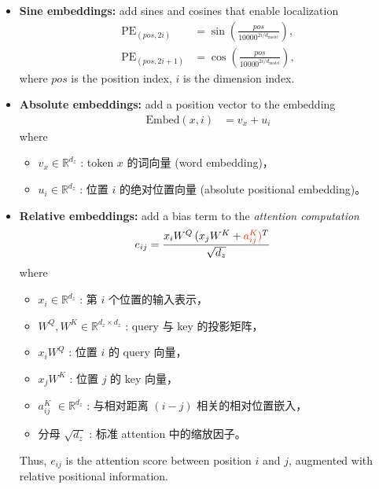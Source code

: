 \begin{itemize}
  \item \textbf{Sine embeddings:} add sines and cosines that enable localization
  \begin{align*}
    \mathrm{PE}_{(pos,2i)}   &= \sin\!\left(\frac{pos}{10000^{2i/d_{\text{model}}}}\right), \\
    \mathrm{PE}_{(pos,2i+1)} &= \cos\!\left(\frac{pos}{10000^{2i/d_{\text{model}}}}\right),
  \end{align*}
  where $pos$ is the position index, $i$ is the dimension index.

\item \textbf{Absolute embeddings:} add a position vector to the embedding
  \begin{align*}
    \mathrm{Embed}(x,i) &= v_x + u_i
  \end{align*}
  where 
  \begin{itemize}
    \item $v_x \in \mathbb{R}^{d_z}$ : token $x$ 的词向量 (word embedding)，
    \item $u_i \in \mathbb{R}^{d_z}$ : 位置 $i$ 的绝对位置向量 (absolute positional embedding)。
  \end{itemize}

  \item \textbf{Relative embeddings:} add a bias term to the \textit{attention computation}
  \begin{align*}
    e_{ij} &= \frac{x_i W^Q \,(x_j W^K + {\color{tred}a_{ij}^K)}^T}{\sqrt{d_z}}
  \end{align*}
  where
  \begin{itemize}
    \item $x_i \in \mathbb{R}^{d_z}$ : 第 $i$ 个位置的输入表示，
    \item $W^Q, W^K \in \mathbb{R}^{d_z \times d_z}$ : query 与 key 的投影矩阵，
    \item $x_i W^Q$ : 位置 $i$ 的 query 向量，
    \item $x_j W^K$ : 位置 $j$ 的 key 向量，
    \item {\color{tred}$a_{ij}^K$} $\in  \mathbb{R}^{d_z}$ : 与相对距离 $(i-j)$ 相关的相对位置嵌入，
    \item 分母 $\sqrt{d_z}$ : 标准 attention 中的缩放因子。
  \end{itemize}
  Thus, $e_{ij}$ is the attention score between position $i$ and $j$, augmented with relative positional information.
\end{itemize}

